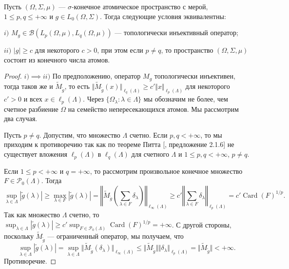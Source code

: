 \begin{proposition}\label{TopInjMultOpCharacOnPureAtomMeasSp} Пусть $(\Omega,\Sigma,\mu)$ --- $\sigma$-конечное атомическое пространство с мерой, $1\leq p,q\leq +\infty$ и $g\in L_0(\Omega,\Sigma)$. Тогда следующие условия эквивалентны:

$i)$ $M_g\in\mathcal{B}(L_p(\Omega,\mu),L_q(\Omega,\mu))$ --- топологически инъективный оператор;

$ii)$ $|g|\geq c$ для некоторого $c>0$, при этом если $p\neq q$, то пространство $(\Omega,\Sigma,\mu)$ состоит из конечного числа атомов.
\end{proposition}
\begin{proof}
$i)$$\implies$$ ii)$ По предположению, оператор $M_g$ топологически инъективен, тогда таков же и $\widetilde{M}_{\widetilde{g}}$, то есть $\Vert\widetilde{M}_{\widetilde{g}}(x)\Vert_{\ell_q(\Lambda)}\geq c'\Vert x\Vert_{\ell_p(\Lambda)}$ для некоторого $c'>0$ и всех $x\in\ell_p(\Lambda)$. Через $\{\Omega_\lambda:\lambda\in\Lambda\}$ мы обозначим не более, чем счетное разбиение $\Omega$ на семейство непересекающихся атомов. Мы рассмотрим два случая.

Пусть $p\neq q$. Допустим, что множество $\Lambda$ счетно. Если $p,q<+\infty$, то мы приходим к противоречию так как по теореме Питта [\cite{KalAlbTopicsBanSpTh}, предложение 2.1.6] не существует вложения $\ell_p(\Lambda)$ в $\ell_q(\Lambda)$ для счетного $\Lambda$ и $1\leq p,q< +\infty$, $p\neq q$. 

Если $1\leq p<+\infty$ и $q=+\infty$, то рассмотрим произвольное конечное множество $F\in\mathcal{P}_0(\Lambda)$. Тогда 
$$
\sup_{\lambda\in\Lambda}|\widetilde{g}(\lambda)|
\geq\max_{\lambda\in F}|\widetilde{g}(\lambda)|
=\left\Vert\widetilde{M}_{\widetilde{g}}\left(\sum_{\lambda\in F}\delta_\lambda\right)\right\Vert_{\ell_\infty(\Lambda)}
\geq c'\left\Vert\sum_{\lambda\in F}\delta_\lambda\right\Vert_{\ell_p(\Lambda)}
=c'\operatorname{Card}(F)^{1/p}.
$$
Так как множество $\Lambda$ счетно, то $\sup_{\lambda\in\Lambda}|\widetilde{g}(\lambda)|\geq c'\sup_{F\in\mathcal{P}_0(\Lambda)}\operatorname{Card}(F)^{1/p}=+\infty$. С другой стороны, поскольку $\widetilde{M}_{\widetilde{g}}$ --- ограниченный оператор, мы получаем, что 
$$
\sup_{\lambda\in\Lambda}|\widetilde{g}(\lambda)|
=\sup_{\lambda\in\Lambda}\Vert\widetilde{M}_{\widetilde{g}}(\delta_\lambda)\Vert_{\ell_\infty(\Lambda)}
\leq\Vert\widetilde{M}_{\widetilde{g}}\Vert\Vert \delta_\lambda\Vert_{\ell_p(\Lambda)}
=\Vert\widetilde{M}_{\widetilde{g}}\Vert<+\infty.
$$
Противоречие.


\end{proof}
